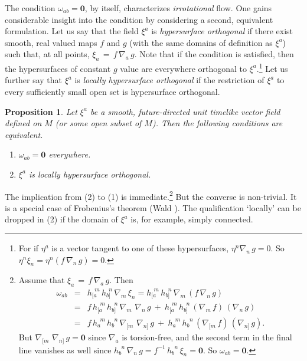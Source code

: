 \documentclass [12] {article}
\theoremstyle{plain}
\newtheorem{proposition}{Proposition}[subsection]
\numberwithin{figure}{subsection}
\numberwithin{proposition}{subsection}
\begin{document}
The condition  $\omega_{ab} = \textbf{0}$, by itself,  characterizes \emph{irrotational}  flow. One gains considerable insight into the condition by considering a second, equivalent formulation.  Let us say that the field $\xi^a$ is \emph{hypersurface orthogonal} if there exist smooth, real valued maps $f$ and  $g$  (with the same domains of definition as $\xi^a$) such that, at all points, $\xi_a \, =  \, f \,  \nabla_a \,  g$.   Note that if the  condition is  satisfied, then the hypersurfaces of constant $g$ value are everywhere orthogonal to $\xi^a$.\footnote{For if $\eta^a$ is a vector tangent to one of these hypersurfaces, $\eta^n \nabla_n \, g   = 0$. So  $\eta^n  \xi_n = \eta^n  ( f \,  \nabla_n \, g) = 0$.}  Let us further say that  $\xi^a$ is \emph{locally hypersurface orthogonal} if the restriction of $\xi^a$ to every sufficiently small open set is hypersurface orthogonal.  %
%
\begin{proposition}\label{Frobenius}
Let $\xi^a$ be a smooth, future-directed unit timelike vector field defined on $M$ (or some open subset of $M$). Then the following conditions  are equivalent.  
\nopagebreak[3]
\vspace{-.5em}
\begin{enumerate}
\vspace{-.5em}
\item [(1)] $\omega_{ab} = \textbf{0}$ everywhere. 
\vspace{-.5em}
\nopagebreak[3]
\item [(2)] $\xi^a$ is locally hypersurface orthogonal. 
\vspace{-.5em}
\end{enumerate}
\end{proposition}
%
The implication from (2) to (1) is immediate.\footnote{Assume that  $\xi_a \, =  \, f \,  \nabla_a \,  g$.  Then
\begin{eqnarray*}
\omega_{ab} & = &  h_{[a}^{\ \ m} \, h_{b]}^{\ \ n} \, \nabla_m \, \xi_n   =      h_{[a}^{\ \ m} \, h_{b]}^{\ \ n} \, \nabla_m \,  (f \, \nabla_n \, g)  \\
& = &  f \,   h_{[a}^{\ \ m} \, h_{b]}^{\ \ n} \, \nabla_m \,   \, \nabla_n \, g \  + \    h_{[a}^{\ \ m} \, h_{b]}^{\ \ n} \, (\nabla_m \, f) \, (\nabla_n \, g) \\
 & = &  f \,   h_a^{\ \ m} \, h_b^{\ \ n} \, \nabla_{[m} \,   \, \nabla_{n]} \, g \  + \    h_a^{\ \ m} \, h_b^{\ \ n} \, (\nabla_{[m} \, f) \, (\nabla_{n]} \, g). 
\end{eqnarray*}  
But $\nabla_{[m} \,   \, \nabla_{n]} \, g = \mathbf{0}$ since $\nabla_a$ is torsion-free,  and the second term in the final line vanishes as well since  $h_b^{\ \ n} \,  \nabla_n \, g = f^{-1} \,  h_b^{\ \ n} \, \xi_n = \mathbf{0}$. So $\omega_{ab} = \mathbf{0}$.}  But the converse is non-trivial. It is a special case of Frobenius's theorem (Wald ).    The qualification `locally' can be dropped in (2) if the  domain of $\xi^a$ is, for example, simply connected.  
\end{document}
